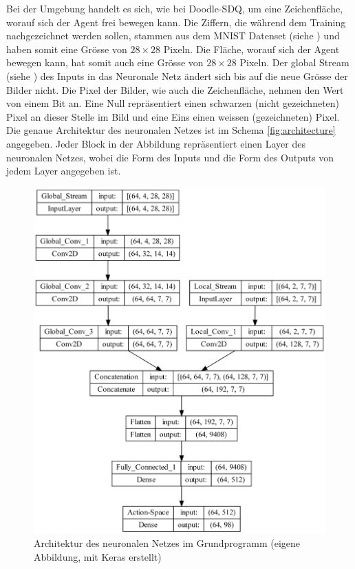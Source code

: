Bei der Umgebung handelt es sich, wie bei Doodle-SDQ, um eine Zeichenfläche,
worauf sich der Agent frei bewegen kann. Die Ziffern, die während dem Training
nachgezeichnet werden sollen, stammen aus dem MNIST Datenset (siehe
) und haben somit eine Grösse von $28\times28$ Pixeln. Die
Fläche, worauf sich der Agent bewegen   
kann, hat somit auch eine Grösse von $28\times28$ Pixeln. Der global Stream
(siehe ) des Inputs in das Neuronale Netz ändert sich
bis auf die neue Grösse der Bilder nicht. Die Pixel der Bilder, wie auch die
Zeichenfläche, nehmen den Wert von einem Bit an. Eine Null repräsentiert einen
schwarzen (nicht gezeichneten) Pixel an dieser Stelle im Bild und eine Eins
einen weissen (gezeichneten) Pixel. Die genaue Architektur des neuronalen Netzes
ist im Schema \autoref{fig:architecture} angegeben. Jeder Block in der Abbildung
repräsentiert einen Layer des neuronalen Netzes, wobei die Form des Inputs und
die Form des Outputs von jedem Layer angegeben ist. 

\begin{figure}[!ht]
  \centering
  \includegraphics[width=\textwidth-2cm]{images/methode/architecture.png}
  \caption{Architektur des neuronalen Netzes im Grundprogramm (eigene Abbildung, mit Keras erstellt)}
  \label{fig:architecture}
\end{figure}



